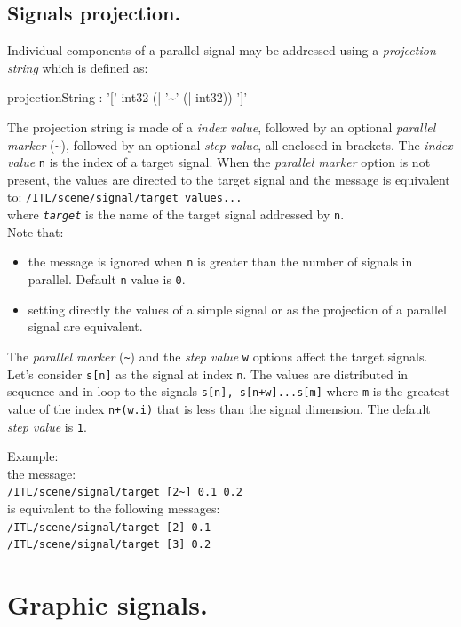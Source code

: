 \documentclass[a4paper,twoside]{report}
\newcommand{\sublevel}[1]	{\section{#1}}
\newcommand{\subsublevel}[1]	{\subsection{#1}}
\newcommand{\OSC}[1]		{\texttt{#1}}
\newcommand{\values}[1]	{\texttt{#1}}
\newcommand{\example}		{\hspace*{1cm}}
\begin{document}
\subsublevel{Signals projection.}
\label{sigproj}
Individual components of a parallel signal may be addressed using a \emph{projection string} which is defined as:
\begin{rail}
projectionString :  '[' int32 (| '\~{}' (| int32)) ']'
\end{rail}

The projection string is made of a \emph{index value}, followed by an optional \emph{parallel marker} (\OSC{\~{}}), followed by an optional \emph{step value}, all enclosed in brackets.
The \emph{index value} \values{n} is the index of a target signal. When the \emph{parallel marker} option is not present, the values are directed to the target signal and the message is equivalent to:
\example \texttt{/ITL/scene/signal/target values...} \\
where \OSC{\textit{target}} is the name of the target signal addressed by \values{n}. \\
Note that:
\begin{itemize}
\item the message is ignored when \values{n} is greater than the number of signals in parallel. Default \values{n} value is \values{0}. 
\item setting directly the values of a simple signal or as the projection of a parallel signal are equivalent.
\end{itemize}

The \emph{parallel marker} (\OSC{\~{}}) and the \emph{step value} \values{w} options affect the target signals. Let's consider \values{s[n]} as the signal at index \values{n}. The values are distributed in sequence and in loop to the signals \values{s[n], s[n+w]...s[m]} where \values{m} is the greatest value of the index \values{n+(w.i)} that is less than the signal dimension. The default  \emph{step value} is \values{1}.

Example: \\
\example the message: \\
\example \example \texttt{/ITL/scene/signal/target [2\~{}] 0.1 0.2} \\
\example is equivalent to the following messages: \\
\example \example \texttt{/ITL/scene/signal/target [2] 0.1}\\
\example \example \texttt{/ITL/scene/signal/target [3] 0.2}


\sublevel{Graphic signals.}
\label{gsignal}
\end{document}

